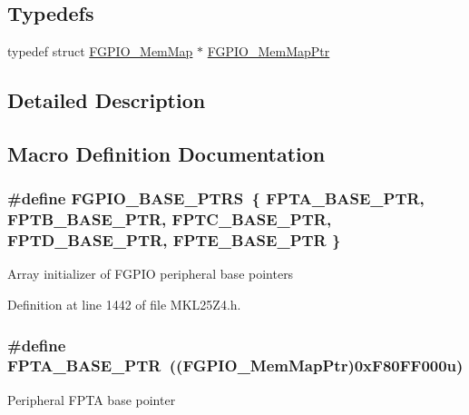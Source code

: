 \subsection*{Typedefs}
\begin{DoxyCompactItemize}
\item 
typedef struct \hyperlink{struct_f_g_p_i_o___mem_map}{F\+G\+P\+I\+O\+\_\+\+Mem\+Map} $\ast$ \hyperlink{group___f_g_p_i_o___peripheral_gaeed3beeb5e5c99ae5b0e404b21466e55}{F\+G\+P\+I\+O\+\_\+\+Mem\+Map\+Ptr}
\end{DoxyCompactItemize}


\subsection{Detailed Description}


\subsection{Macro Definition Documentation}
\subsubsection[{\texorpdfstring{F\+G\+P\+I\+O\+\_\+\+B\+A\+S\+E\+\_\+\+P\+T\+RS}{FGPIO_BASE_PTRS}}]{\setlength{\rightskip}{0pt plus 5cm}\#define F\+G\+P\+I\+O\+\_\+\+B\+A\+S\+E\+\_\+\+P\+T\+RS~\{ {\bf F\+P\+T\+A\+\_\+\+B\+A\+S\+E\+\_\+\+P\+TR}, {\bf F\+P\+T\+B\+\_\+\+B\+A\+S\+E\+\_\+\+P\+TR}, {\bf F\+P\+T\+C\+\_\+\+B\+A\+S\+E\+\_\+\+P\+TR}, {\bf F\+P\+T\+D\+\_\+\+B\+A\+S\+E\+\_\+\+P\+TR}, {\bf F\+P\+T\+E\+\_\+\+B\+A\+S\+E\+\_\+\+P\+TR} \}}\hypertarget{group___f_g_p_i_o___peripheral_ga58956e4d0a0ffec3e1dd70e77a5160b4}{}\label{group___f_g_p_i_o___peripheral_ga58956e4d0a0ffec3e1dd70e77a5160b4}
Array initializer of F\+G\+P\+IO peripheral base pointers 

Definition at line 1442 of file M\+K\+L25\+Z4.\+h.

\subsubsection[{\texorpdfstring{F\+P\+T\+A\+\_\+\+B\+A\+S\+E\+\_\+\+P\+TR}{FPTA_BASE_PTR}}]{\setlength{\rightskip}{0pt plus 5cm}\#define F\+P\+T\+A\+\_\+\+B\+A\+S\+E\+\_\+\+P\+TR~(({\bf F\+G\+P\+I\+O\+\_\+\+Mem\+Map\+Ptr})0x\+F80\+F\+F000u)}\hypertarget{group___f_g_p_i_o___peripheral_ga4b0d89f517528ab7c1d2fdefe4c863d8}{}\label{group___f_g_p_i_o___peripheral_ga4b0d89f517528ab7c1d2fdefe4c863d8}
Peripheral F\+P\+TA base pointer 

